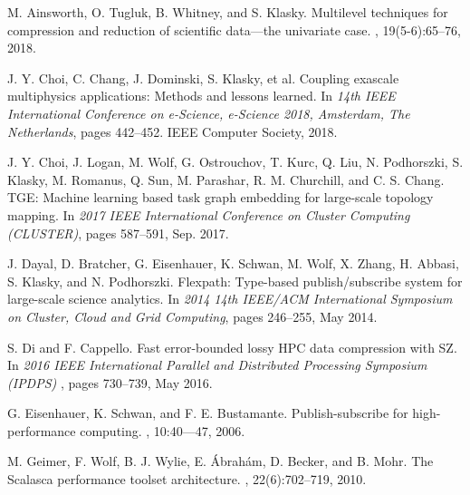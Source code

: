 \begin{thebibliography}{10}
\setlength{\itemsep}{0pt plus 0.2ex}
\footnotesize

 M. Ainsworth, O. Tugluk, B. Whitney, and S. Klasky.  \newblock Multilevel techniques for compression and reduction of scientific data---the univariate case. , 19(5-6):65–76, 2018.

 J. Y. Choi, C. Chang, J. Dominski, S. Klasky, et al. 
\newblock Coupling exascale multiphysics applications:  Methods and lessons learned. \newblock In {\em 14th IEEE International Conference on e-Science, e-Science 2018, Amsterdam, The Netherlands}, pages 442–452. IEEE Computer Society, 2018.

 J. Y. Choi, J. Logan, M. Wolf, G. Ostrouchov, T. Kurc, Q. Liu, N. Podhorszki, S. Klasky, M. Romanus, Q. Sun, M. Parashar, R. M. Churchill, and C. S. Chang.  \newblock TGE: Machine learning based task graph embedding for large-scale topology mapping. \newblock In {\em 2017 IEEE
International Conference on Cluster Computing (CLUSTER)}, pages 587–591, Sep. 2017.

 J. Dayal, D. Bratcher, G. Eisenhauer, K. Schwan, M. Wolf, X. Zhang, H. Abbasi, S. Klasky, and N. Podhorszki. \newblock Flexpath: Type-based publish/subscribe system for large-scale science analytics. \newblock In {\em 2014 14th IEEE/ACM International Symposium on Cluster,
Cloud and Grid Computing}, pages 246–255, May 2014.

  S. Di  and  F.  Cappello. \newblock  Fast  error-bounded  lossy  HPC  data  compression  with  SZ.   \newblock In
{\em 2016  IEEE  International  Parallel  and
Distributed Processing Symposium (IPDPS)}
, pages 730–739, May 2016.

 G. Eisenhauer, K. Schwan, and F. E. Bustamante. \newblock Publish-subscribe for high-performance computing. , 10:40---47, 2006.

 M. Geimer, F. Wolf, B. J. Wylie, E.
{\'A}brah{\'a}m, D. Becker, and B. Mohr.  \newblock The Scalasca performance toolset architecture. , 22(6):702–719, 2010.


\end{thebibliography}
